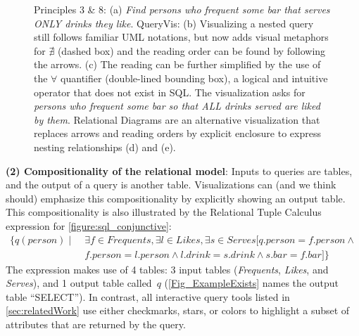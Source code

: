 \documentclass[letterpaper,11pt]{article}
\newcommand{\queryvis}{\textsf{QueryVis}\xspace}
\newcommand{\diagrams}{\textsf{Relational Diagrams}\xspace}
\begin{document}
\begin{figure}[t]
{{        \vspace{1mm}
        \label{Fig_ExampleNotExistsRDShaded}
	}		
}      
    \caption{
	Principles 3 \& 8:
	(a) \emph{Find persons who frequent some bar that serves 
	ONLY drinks they like}. 
	\queryvis:
	(b) Visualizing a nested query still follows familiar UML notations, 
	but now adds visual metaphors for $\nexists$ (dashed box) and 
	the reading order can be found by following the arrows.
	(c) The reading can be further simplified by the use of the $\forall$ quantifier 
	(double-lined bounding box), a logical and intuitive operator that does not exist in SQL.
	The visualization asks for \emph{persons who frequent some bar so that 
	{ALL} drinks served are liked by them}.
	\diagrams are an alternative visualization that replaces arrows and reading orders by 
	explicit enclosure to express nesting relationships (d) and (e).
	}
    \label{Fig_ExampleVisualizations}
\end{figure}

%





\textbf{(2) Compositionality of the relational model}:
Inputs to queries are tables, and the output of a query is another table. 
Visualizations can (and we think should) emphasize this compositionality by explicitly showing an output table. 
This compositionality is also illustrated by the Relational Tuple Calculus expression for \autoref{figure:sql_conjunctive}:
\begin{align*}
	\{ q(\textit{person}) \mid \;
	& \exists f \in \textit{Frequents}, \exists l \in \textit{Likes}, \exists s \in \textit{Serves} 
	[
	q.\textit{person} = f.\textit{person} \wedge \\
	& 	
	f.\textit{person} = l.\textit{person} \wedge 
	l.\textit{drink} = s.\textit{drink} \wedge 	
	s.\textit{bar} = f.\textit{bar}
	] \}	
\end{align*}
The expression makes use of 4 tables: 3 input tables (\textit{Frequents}, \textit{Likes}, and \textit{Serves}), and 1 output table called~$q$
(\autoref{Fig_ExampleExists} names the output table ``SELECT'').
In contrast, all interactive query tools listed in \autoref{sec:relatedWork} use either checkmarks, stars, or colors
%
to highlight a subset of attributes that are returned by the query.
\end{document}
